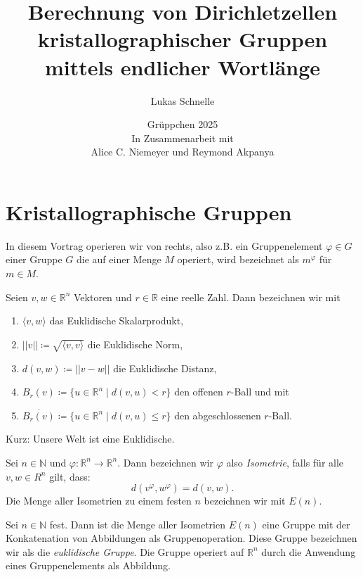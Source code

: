 \documentclass{beamer}
\title{Berechnung von Dirichletzellen kristallographischer Gruppen mittels endlicher Wortlänge }
\author{Lukas Schnelle}
\date{Grüppchen 2025 \\ In Zusammenarbeit mit \\Alice C. Niemeyer und Reymond Akpanya}
\theoremstyle{plain}
\newcommand\R{\mathbb R}
\newcommand\N{\mathbb N}
\renewcommand{\phi}{\varphi}
\begin{document}
\frame[plain]{\titlepage}

\section{Kristallographische Gruppen}
\begin{frame}
    In diesem Vortrag operieren wir von rechts, also z.B. ein Gruppenelement $\phi \in G$ einer Gruppe $G$ die auf einer Menge $M$ operiert, wird bezeichnet als $m^\phi$ für $m \in M$.
    \pause
    \begin{notation}
        Seien $v, w \in \R^n$ Vektoren und $r \in \R$ eine reelle Zahl. \pause 
        Dann bezeichnen wir mit 
        \begin{enumerate}[label=(\roman*)]
            \item $\langle v, w \rangle$ das Euklidische Skalarprodukt,\pause
            \item $||v|| \coloneqq \sqrt{\langle v, v \rangle}$ die Euklidische Norm,\pause
            \item $d(v, w) \coloneqq ||v - w ||$ die Euklidische Distanz,\pause
            \item $B_r(v) \coloneqq \{ u \in \R^n \mid d(v, u) < r \}$ den offenen $r$-Ball und mit \pause
            \item $\overline{B_r(v)} \coloneqq \{ u \in \R^n \mid d(v, u) \leq r \}$ den abgeschlossenen $r$-Ball. 
        \end{enumerate}  
    \end{notation}
    \pause
    Kurz: Unsere Welt ist eine Euklidische.
\end{frame}

\begin{frame}
    \begin{definition}
        Sei $n \in \N$ und $\phi: \R^n \to \R^n$. Dann bezeichnen wir $\phi$ also \emph{Isometrie}, falls für alle $v, w \in R^n$ gilt, dass:
        $$
            d(v^\phi, w^\phi) = d(v, w).
        $$\pause
        Die Menge aller Isometrien zu einem festen $n$ bezeichnen wir mit $E(n)$.
    \end{definition}
    \pause
    \begin{proposition}
        Sei $n \in \N$ fest. Dann ist die Menge aller Isometrien $E(n)$ eine Gruppe mit der Konkatenation von Abbildungen als Gruppenoperation.
        Diese Gruppe bezeichnen wir als die \emph{euklidische Gruppe}. Die Gruppe operiert auf $\R^n$ durch die Anwendung eines Gruppenelements als Abbildung.
    \end{proposition}
\end{frame}
\end{document}
